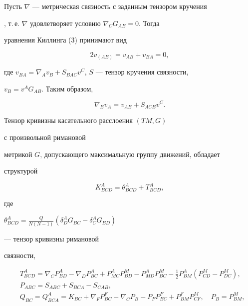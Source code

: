 Пусть $\nabla$ --- метрическая связность с заданным тензором кручения


\cite{3}, т.\,е. $\nabla$ удовлетворяет условию $\nabla_C G_{AB}=0$. Тогда


уравнения Киллинга (3) принимают вид


$$


2v_{(AB)}=v_{AB}+v_{BA}=0,


$$


где $v_{BA}=\nabla_A v_B+S_{BAC}v^C$, $S$ --- тензор кручения связности,


$v_B=v^A G_{AB}$. Таким образом,


\begin{equation}


\nabla_B v_A=v_{AB}+S_{ACB}v^C.


\end{equation}


Тензор кривизны касательного расслоения $(TM,G)$


с произвольной римановой


метрикой $G$, допускающего максимальную группу движений, обладает


структурой


\begin{equation}


K^A_{BCD}=\theta^A_{BCD}+T^A_{BCD},


\end{equation}


где


$\theta^A_{BCD}=\frac{Q}{N(N-1)}(\delta^A_D G_{BC}-


\delta^A_C G_{BD})$


--- тензор кривизны римановой


связности,


\begin{equation}


\begin{split}


& T^A_{BCD}=\nabla_C P^A_{BD}-\nabla_D P^A_{BC}+


P^A_{MC}P^M_{BD}-P^A_{MD}P^M_{BC}-\tfrac{1}{2}P^A_{BM}


(P^M_{CD}-P^M_{DC}), \\


& P_{ABC}=S_{ABC}+S_{BCA}-S_{CAB}, \\


& Q_{BC}=Q^A_{BCA}=K_{BC}+\nabla_F P^F_{BC}-


\nabla_C P_B-P_F P^F_{BC}+P^F_{BM}P^M_{CF},\quad


P_B=P^M_{BM},


\end{split}


\end{equation}


